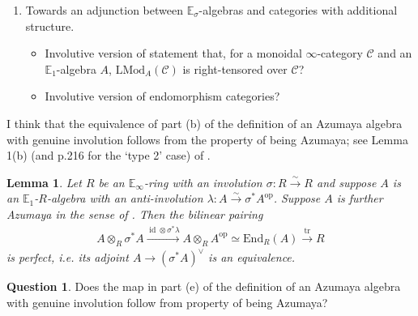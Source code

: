 \documentclass{article}
\DeclareMathOperator{\id}{id} %
\newcommand{\EE}{\mathbb{E}}
\newcommand{\op}{\mathrm{op}}
\newtheorem{lemma}[equation]{Lemma}
\theoremstyle{definition}
\newtheorem{question}[equation]{Question}
\newcommand{\Lucy}[1]{\todo[color=cyan!30]{\footnotesize L: #1}}
\begin{document}
\begin{enumerate}[label=(\alph*)]
\begin{itemize}
    \end{itemize} 
    \item Towards an adjunction between $ \EE_\sigma $-algebras and categories with additional structure.  
    \begin{itemize}
        \item Involutive version of statement that, for a monoidal $ \infty $-category $ \mathcal{C} $ and an $ \EE_1 $-algebra $ A $, $ \mathrm{LMod}_A(\mathcal{C}) $ is right-tensored over $ \mathcal{C} $? 
        \item Involutive version of endomorphism categories? \cite[\S4.7.1]{LurHA}
    \end{itemize}
\end{enumerate} 
I think that the equivalence of part (b) of the definition of an Azumaya algebra with genuine involution follows from the property of being Azumaya; see Lemma 1(b) (and p.216 for the `type 2' case) of \cite{MR1162189}. 
\begin{lemma}
    Let $ R $ be an $ \EE_\infty $-ring with an involution $ \sigma \colon R \xrightarrow{\sim} R$ and suppose $ A $ is an $ \EE_1 $-$ R $-algebra with an anti-involution $ \lambda \colon A \xrightarrow{\sim} \sigma^* A^\op $. 
    Suppose $ A $ is further Azumaya in the sense of \Lucy{reference}. 
    Then the bilinear pairing 
    \begin{equation*}
    \begin{split}
        A \otimes_R \sigma^* A \xrightarrow{\id \otimes \sigma^*\lambda} A \otimes_R A^\op \simeq \mathrm{End}_R(A) \xrightarrow{\mathrm{tr}} R     
    \end{split}    
    \end{equation*}
    is perfect, i.e. its adjoint $ A \to (\sigma^* A)^\vee $ is an equivalence. 
\end{lemma}
\begin{question}
    Does the map in part (e) of the definition of an Azumaya algebra with genuine involution follow from property of being Azumaya? 
\end{question}
\end{document}
